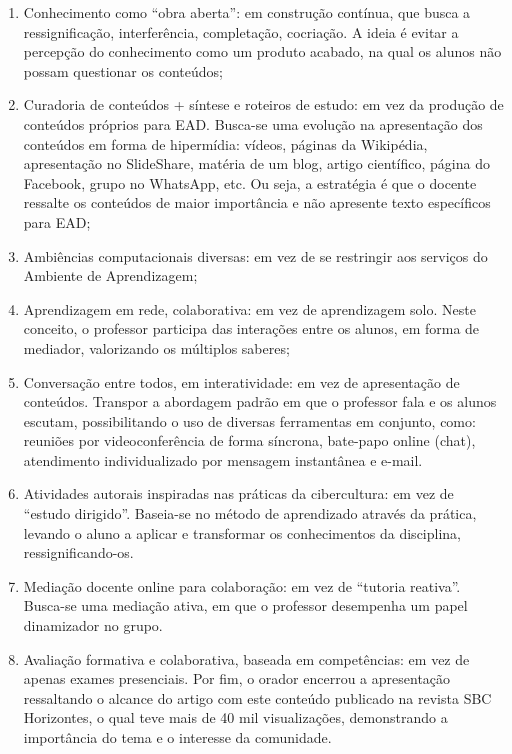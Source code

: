 \begin{enumerate}
  \item Conhecimento como ``obra aberta'': em construção contínua, que busca a ressignificação, interferência, completação, cocriação. A ideia é evitar a percepção do conhecimento como um produto acabado, na qual os alunos não possam questionar os conteúdos;
  \item Curadoria de conteúdos + síntese e roteiros de estudo: em vez da produção de conteúdos próprios para EAD. Busca-se uma evolução na apresentação dos conteúdos em forma de hipermídia: vídeos, páginas da Wikipédia, apresentação no SlideShare, matéria de um blog, artigo científico, página do Facebook, grupo no WhatsApp, etc. Ou seja, a estratégia é que o docente ressalte os conteúdos de maior importância e não apresente texto específicos para EAD;
  \item Ambiências computacionais diversas: em vez de se restringir aos serviços do Ambiente de Aprendizagem;
  \item Aprendizagem em rede, colaborativa: em vez de aprendizagem solo. Neste conceito, o professor participa das interações entre os alunos, em forma de mediador, valorizando os múltiplos saberes;
  \item Conversação entre todos, em interatividade: em vez de apresentação de conteúdos. Transpor a abordagem padrão em que o professor fala e os alunos escutam, possibilitando o uso de diversas ferramentas em conjunto, como: reuniões por videoconferência de forma síncrona, bate-papo online (chat), atendimento individualizado por mensagem instantânea e e-mail.
  \item Atividades autorais inspiradas nas práticas da cibercultura: em vez de “estudo dirigido”. Baseia-se no método de aprendizado através da prática, levando o aluno a aplicar e transformar os conhecimentos da disciplina, ressignificando-os.
  \item Mediação docente online para colaboração: em vez de “tutoria reativa”. Busca-se uma mediação ativa, em que o professor desempenha um papel dinamizador no grupo.
  \item Avaliação formativa e colaborativa, baseada em competências: em vez de apenas exames presenciais.
	Por fim, o orador encerrou a apresentação ressaltando o alcance do artigo com este conteúdo publicado na revista SBC Horizontes, o qual teve mais de 40 mil visualizações, demonstrando a importância do tema e o interesse da comunidade.
\end{enumerate}